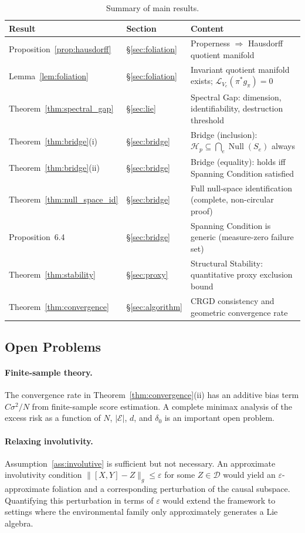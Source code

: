 \documentclass[11pt,a4paper]{article}
\DeclareMathOperator{\Null}{Null}
\newcommand{\cH}{\mathcal{H}}
\newcommand{\cD}{\mathcal{D}}
\newcommand{\cE}{\mathcal{E}}
\newcommand{\LP}{\mathcal{L}}
\begin{document}
\begin{table}[t]
\centering
\small
\begin{tabular}{llp{5cm}}
\toprule
\textbf{Result} & \textbf{Section} & \textbf{Content} \\
\midrule
Proposition~\ref{prop:hausdorff} & \S\ref{sec:foliation} & Properness $\Rightarrow$ Hausdorff quotient manifold \\
Lemma~\ref{lem:foliation} & \S\ref{sec:foliation} & Invariant quotient manifold exists; $\LP_{V_e}(\pi^* g_\pi) = 0$ \\
Theorem~\ref{thm:spectral_gap} & \S\ref{sec:lie} & Spectral Gap: dimension, identifiability, destruction threshold \\
Theorem~\ref{thm:bridge}(i) & \S\ref{sec:bridge} & Bridge (inclusion): $\cH_p \subseteq \bigcap_e \Null(S_e)$ always \\
Theorem~\ref{thm:bridge}(ii) & \S\ref{sec:bridge} & Bridge (equality): holds iff Spanning Condition satisfied \\
Theorem~\ref{thm:null_space_id} & \S\ref{sec:bridge} & Full null-space identification (complete, non-circular proof) \\
Proposition~6.4 & \S\ref{sec:bridge} & Spanning Condition is generic (measure-zero failure set) \\
Theorem~\ref{thm:stability} & \S\ref{sec:proxy} & Structural Stability: quantitative proxy exclusion bound \\
Theorem~\ref{thm:convergence} & \S\ref{sec:algorithm} & CRGD consistency and geometric convergence rate \\
\bottomrule
\end{tabular}
\caption{Summary of main results.}
\label{tab:results}
\end{table}

\subsection{Open Problems}

\paragraph{Finite-sample theory.} The convergence rate in Theorem~\ref{thm:convergence}(ii) has an additive bias term $C\sigma^2/N$ from finite-sample score estimation. A complete minimax analysis of the excess risk as a function of $N$, $|\cE|$, $d$, and $\delta_0$ is an important open problem.

\paragraph{Relaxing involutivity.} Assumption~\ref{ass:involutive} is sufficient but not necessary. An approximate involutivity condition $\|[X, Y] - Z\|_g \leq \varepsilon$ for some $Z \in \cD$ would yield an $\varepsilon$-approximate foliation and a corresponding perturbation of the causal subspace. Quantifying this perturbation in terms of $\varepsilon$ would extend the framework to settings where the environmental family only approximately generates a Lie algebra.
\end{document}
